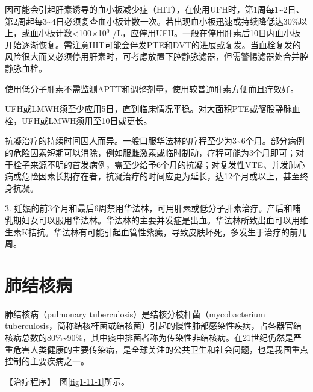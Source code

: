 因可能会引起肝素诱导的血小板减少症（HIT），在使用UFH时，第1周每1\textasciitilde{}2日、第2周起每3\textasciitilde{}4日必须复查血小板计数一次。若出现血小板迅速或持续降低达30\%以上，或血小板计数\textless{}100×10$^{9}$
/L，应停用UFH。一般在停用肝素后10日内血小板开始逐渐恢复。需注意HIT可能会伴发PTE和DVT的进展或复发。当血栓复发的风险很大而又必须停用肝素时，可考虑放置下腔静脉滤器，但需警惕滤器处合并腔静脉血栓。

使用低分子肝素不需监测APTT和调整剂量，使用较普通肝素方便而且疗效好。

UFH或LMWH须至少应用5日，直到临床情况平稳。对大面积PTE或髂股静脉血栓，UFH或LMWH须用至10日或更长。

抗凝治疗的持续时间因人而异。一般口服华法林的疗程至少为3\textasciitilde{}6个月。部分病例的危险因素短期可以消除，例如服雌激素或临时制动，疗程可能为3个月即可；对于栓子来源不明的首发病例，需至少给予6个月的抗凝；对复发性VTE、并发肺心病或危险因素长期存在者，抗凝治疗的时间应更为延长，达12个月或以上，甚至终身抗凝。

3.
妊娠的前3个月和最后6周禁用华法林，可用肝素或低分子肝素治疗。产后和哺乳期妇女可以服用华法林。华法林的主要并发症是出血。华法林所致出血可以用维生素K拮抗。华法林有可能引起血管性紫癜，导致皮肤坏死，多发生于治疗的前几周。

\section{肺结核病}

肺结核病（pulmonary tuberculosis）是结核分枝杆菌（mycobacterium
tuberculosis，简称结核杆菌或结核菌）引起的慢性肺部感染性疾病，占各器官结核病总数的80\%\textasciitilde{}90\%，其中痰中排菌者称为传染性非结核病。在21世纪仍然是严重危害人类健康的主要传染病，是全球关注的公共卫生和社会问题，也是我国重点控制的主要疾病之一。

【治疗程序】　图\ref{fig1-11-1}所示。

